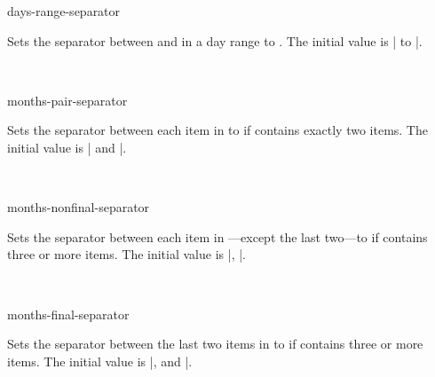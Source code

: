 \documentclass{beerydoc}
\begin{document}
\begin{codedoc}{days-range-separator}
  \begin{syntax}
  \end{syntax}
  Sets the separator between  and  in a day range to
  .
  The initial value is | to |.
  \begin{codedemo}
    \\
  \end{codedemo}
\end{codedoc}

\begin{codedoc}{months-pair-separator}
  \begin{syntax}
  \end{syntax}
  Sets the separator between each item in  to  if
   contains exactly two items.
  The initial value is | and |.
  \begin{codedemo}
    \\
  \end{codedemo}
\end{codedoc}

\begin{codedoc}{months-nonfinal-separator}
  \begin{syntax}
  \end{syntax}
  Sets the separator between each item in ---except the last
  two---to  if  contains three or more items.
  The initial value is |, |.
  \begin{codedemo}
    \\
  \end{codedemo}
\end{codedoc}

\begin{codedoc}{months-final-separator}
  \begin{syntax}
  \end{syntax}
  Sets the separator between the last two items in  to
   if  contains three or more items.
  The initial value is |, and |.
  \begin{codedemo}
    \\
  \end{codedemo}
\end{codedoc}
\end{document}
